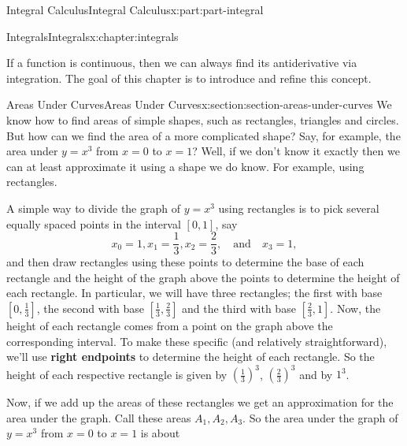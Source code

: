 \documentclass[twoside,10pt,]{book}
\newcommand{\terminology}[1]{\textbf{#1}}
\numberwithin{equation}{part}
\begin{document}
\begin{partptx}{Integral Calculus}{}{Integral Calculus}{}{}{x:part:part-integral}
%
\typeout{************************************************}
\typeout{************************************************}
%
\begin{chapterptx}{Integrals}{}{Integrals}{}{}{x:chapter:integrals}
\begin{introduction}{}%
If a function is continuous, then we can always find its antiderivative via integration. The goal of this chapter is to introduce and refine this concept.%
\end{introduction}%
%
%
\typeout{************************************************}
\typeout{************************************************}
%
\begin{sectionptx}{Areas Under Curves}{}{Areas Under Curves}{}{}{x:section:section-areas-under-curves}
We know how to find areas of simple shapes, such as rectangles, triangles and circles. But how can we find the area of a more complicated shape? Say, for example, the area under \(y=x^{3}\) from \(x=0\) to \(x=1\)? Well, if we don't know it exactly then we can at least approximate it using a shape we do know. For example, using rectangles.%
\par
A simple way to divide the graph of \(y=x^{3}\) using rectangles is to pick several equally spaced points in the interval \([0,1]\), say%
\begin{equation*}
x_{0} = 1, x_{1} = \frac{1}{3}, x_{2} = \frac{2}{3}, \quad\text{and}\quad x_{3} = 1,
\end{equation*}
and then draw rectangles using these points to determine the base of each rectangle and the height of the graph above the points to determine the height of each rectangle. In particular, we will have three rectangles; the first with base \([0,\frac{1}{3}]\), the second with base \([\frac{1}{3},\frac{2}{3}]\) and the third with base \([\frac{2}{3},1]\). Now, the height of each rectangle comes from a point on the graph above the corresponding interval. To make these specific (and relatively straightforward), we'll use \terminology{right endpoints} to determine the height of each rectangle. So the height of each respective rectangle is given by \((\frac{1}{3})^{3}\), \((\frac{2}{3})^{3}\) and by \(1^{3}\).%
\par
Now, if we add up the areas of these rectangles we get an approximation for the area under the graph. Call these areas \(A_{1},A_{2},A_{3}\). So the area under the graph of \(y = x^{3}\) from \(x=0\) to \(x=1\) is about%

\end{sectionptx}
\end{chapterptx}
\end{partptx}
\end{document}
